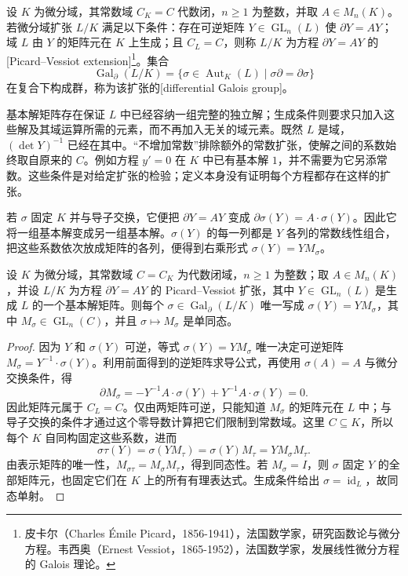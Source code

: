 \begin{definition}\label{b1:def:picard-vessiot}
	设 \(K\) 为微分域，其常数域 \(C_K=C\) 代数闭，\(n\geq1\) 为整数，并取 \(A\in M_n(K)\)。若微分域扩张 \(L/K\) 满足以下条件：存在可逆矩阵 \(Y\in\operatorname{GL}_n(L)\) 使 \(\partial Y=AY\)；域 \(L\) 由 \(Y\) 的矩阵元在 \(K\) 上生成；且 \(C_L=C\)，则称 \(L/K\) 为方程 \(\partial Y=AY\) 的[Picard--Vessiot extension]\footnote{皮卡尔（Charles Émile Picard，1856-1941），法国数学家，研究函数论与微分方程。韦西奥（Ernest Vessiot，1865-1952），法国数学家，发展线性微分方程的 Galois 理论。}。集合
	\[
		\operatorname{Gal}_{\partial}(L/K)= \{\sigma\in\operatorname{Aut}_K(L)\mid\sigma\partial=\partial\sigma\}
	\]
	在复合下构成群，称为该扩张的[differential Galois group]。
\end{definition}

基本解矩阵存在保证 \(L\) 中已经容纳一组完整的独立解；生成条件则要求只加入这些解及其域运算所需的元素，而不再加入无关的域元素。既然 \(L\) 是域，\((\det Y)^{-1}\) 已经在其中。“不增加常数”排除额外的常数扩张，使解之间的系数始终取自原来的 \(C\)。例如方程 \(y'=0\) 在 \(K\) 中已有基本解 \(1\)，并不需要为它另添常数。这些条件是对给定扩张的检验；定义本身没有证明每个方程都存在这样的扩张。

\ProseParagraphBreak
若 \(\sigma\) 固定 \(K\) 并与导子交换，它便把 \(\partial Y=AY\) 变成 \(\partial\sigma(Y)=A\cdot\sigma(Y)\)。因此它将一组基本解变成另一组基本解。\(\sigma(Y)\) 的每一列都是 \(Y\) 各列的常数线性组合，把这些系数依次放成矩阵的各列，便得到右乘形式 \(\sigma(Y)=YM_\sigma\)。

\begin{proposition}\label{b1:prop:differential-galois-matrices}
	设 \(K\) 为微分域，其常数域 \(C=C_K\) 为代数闭域，\(n\geq1\) 为整数；取 \(A\in M_n(K)\)，并设 \(L/K\) 为方程 \(\partial Y=AY\) 的 Picard--Vessiot 扩张，其中 \(Y\in\operatorname{GL}_n(L)\) 是生成 \(L\) 的一个基本解矩阵。则每个 \(\sigma\in\operatorname{Gal}_{\partial}(L/K)\) 唯一写成 \(\sigma(Y)=YM_\sigma\)，其中 \(M_\sigma\in\operatorname{GL}_n(C)\)，并且 \(\sigma\mapsto M_\sigma\) 是单同态。
\end{proposition}

\begin{proof}
	因为 \(Y\) 和 \(\sigma(Y)\) 可逆，等式 \(\sigma(Y)=YM_\sigma\) 唯一决定可逆矩阵 \(M_\sigma=Y^{-1}\cdot\sigma(Y)\)。利用前面得到的逆矩阵求导公式，再使用 \(\sigma(A)=A\) 与微分交换条件，得
	\[
		\partial M_\sigma=-Y^{-1}A\cdot\sigma(Y)+Y^{-1}A\cdot\sigma(Y)=0.
	\]
	因此矩阵元属于 \(C_L=C\)。仅由两矩阵可逆，只能知道 \(M_\sigma\) 的矩阵元在 \(L\) 中；与导子交换的条件才通过这个零导数计算把它们限制到常数域。这里 \(C\subseteq K\)，所以每个 \(K\) 自同构固定这些系数，进而
	\[
		\sigma\tau(Y)=\sigma(YM_\tau)=\sigma(Y)M_\tau =YM_\sigma M_\tau.
	\]
	由表示矩阵的唯一性，\(M_{\sigma\tau}=M_\sigma M_\tau\)，得到同态性。若 \(M_\sigma=I\)，则 \(\sigma\) 固定 \(Y\) 的全部矩阵元，也固定它们在 \(K\) 上的所有有理表达式。生成条件给出 \(\sigma=\operatorname{id}_L\)，故同态单射。
\end{proof}

